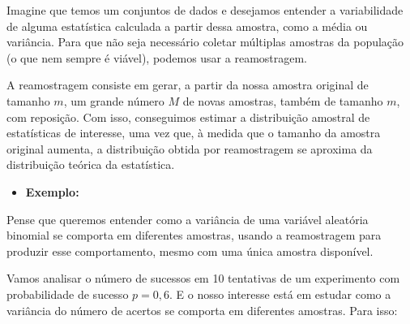 \documentclass[
]{book}
\providecommand{\tightlist}{%
  \setlength{\itemsep}{0pt}\setlength{\parskip}{0pt}}
\begin{document}
Imagine que temos um conjuntos de dados e desejamos entender a variabilidade de alguma estatística calculada a partir dessa amostra, como a média ou variância. Para que não seja necessário coletar múltiplas amostras da população (o que nem sempre é viável), podemos usar a reamostragem.

A reamostragem consiste em gerar, a partir da nossa amostra original de tamanho \(m\), um grande número \(M\) de novas amostras, também de tamanho \(m\), com reposição. Com isso, conseguimos estimar a distribuição amostral de estatísticas de interesse, uma vez que, à medida que o tamanho da amostra original aumenta, a distribuição obtida por reamostragem se aproxima da distribuição teórica da estatística.

\begin{itemize}
\tightlist
\item
  \textbf{Exemplo:}
\end{itemize}

Pense que queremos entender como a variância de uma variável aleatória binomial se comporta em diferentes amostras, usando a reamostragem para produzir esse comportamento, mesmo com uma única amostra disponível.

Vamos analisar o número de sucessos em 10 tentativas de um experimento com probabilidade de sucesso \(p=0,6\). E o nosso interesse está em estudar como a variância do número de acertos se comporta em diferentes amostras. Para isso:
\end{document}
